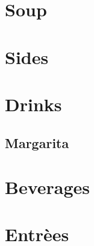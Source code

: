 \documentclass{family_cookbook}
\begin{document}
\chapter{Soup}
\minitoc
\clearpage






\chapter{Sides}
\minitoc
\clearpage




\chapter{Drinks}
\minitoc
\clearpage


\section{Margarita}
{
	\let\section\subsection
	\let\subsection\subsubsection
	
	
	
	
}





\chapter{Beverages}
\minitoc
\clearpage



\chapter{Entr\`{e}es}
\minitoc
\clearpage










\end{document}
